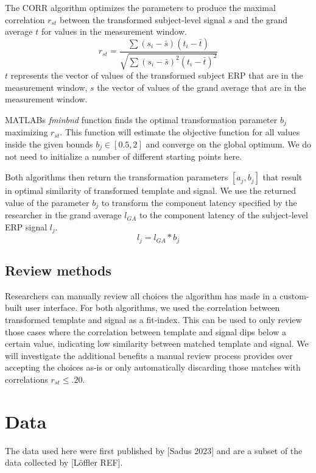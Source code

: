 \documentclass[
  man,floatsintext]{apa7}
\begin{document}
The CORR algorithm optimizes the parameters to produce the maximal correlation \(r_{st}\) between the transformed subject-level signal \(s\) and the grand average \(t\) for values in the measurement window.
\[r_{st} = \frac{\sum(s_i - \bar{s})(t_{i} - \bar{t})}{\sqrt{\sum(s_i - \bar{s})^2(t_{i} - \bar{t})^2}}\]
\(t\) represents the vector of values of the transformed subject ERP that are in the measurement window, \(s\) the vector of values of the grand average that are in the measurement window.

MATLABs \emph{fminbnd} function finds the optimal transformation parameter \(b_j\) maximizing \(r_{st}\). This function will estimate the objective function for all values inside the given bounds \(b_j \in [0.5, 2]\) and converge on the global optimum. We do not need to initialize a number of different starting points here.

Both algorithms then return the transformation parameters \([a_j, b_j]\) that result in optimal similarity of transformed template and signal. We use the returned value of the parameter \(b_j\) to transform the component latency specified by the researcher in the grand average \(l_{GA}\) to the component latency of the subject-level ERP signal \(l_j\).
\[ l_j = l_{GA} * b_j \]

\hypertarget{review-methods}{%
\subsection{Review methods}\label{review-methods}}

Researchers can manually review all choices the algorithm has made in a custom-built user interface. For both algorithms, we used the correlation between transformed template and signal as a fit-index. This can be used to only review those cases where the correlation between template and signal dips below a certain value, indicating low similarity between matched template and signal. We will investigate the additional benefits a manual review process provides over accepting the choices as-is or only automatically discarding those matches with correlations \(r_{st} \le .20\).

\hypertarget{data}{%
\section{Data}\label{data}}

The data used here were first published by {[}Sadus 2023{]} and are a subset of the data collected by {[}Löffler REF{]}.
\end{document}

